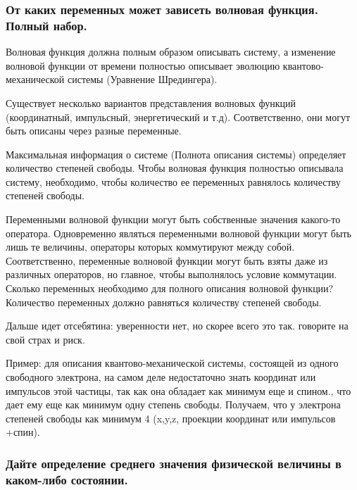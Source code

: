 \subsubsection{От каких переменных может зависеть волновая функция. Полный набор.}



Волновая функция должна полным образом описывать систему, а изменение волновой функции от времени полностью описывает эволюцию квантово-механической системы (Уравнение Шредингера). 

Существует несколько вариантов представления волновых функций (координатный, импульсный, энергетический и т.д). Соответственно, они могут быть описаны через разные переменные. 

Максимальная информация о системе (Полнота описания системы) определяет количество степеней свободы. Чтобы волновая функция полностью описывала систему, необходимо, чтобы количество ее переменных равнялось количеству степеней свободы. 

Переменными волновой функции могут быть собственные значения какого-то оператора. Одновременно являться переменными волновой функции могут быть лишь те величины, операторы которых коммутируют между собой. Соответственно, переменные волновой функции могут быть взяты даже из различных операторов, но главное, чтобы выполнялось условие коммутации. Сколько переменных необходимо для полного описания волновой функции? Количество переменных должно равняться количеству степеней свободы.

Дальше идет отсебятина: уверенности нет, но скорее всего это так. говорите на свой страх и риск. 

 Пример: для описания квантово-механической системы, состоящей из одного свободного электрона, на самом деле недостаточно знать координат или импульсов этой частицы, так как она обладает как минимум еще и спином., что дает ему еще как минимум одну степень свободы. Получаем, что у электрона степеней свободы как минимум 4 (x,y,z, проекции координат или импульсов +спин). 


\subsubsection{ {Дайте определение среднего значения физической величины в каком-либо
состоянии.}}

